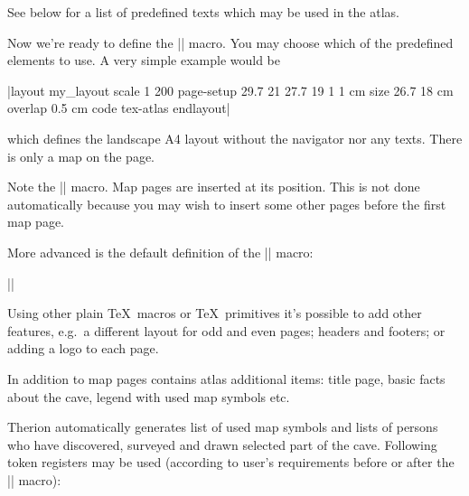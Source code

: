 See below for a list of predefined texts which may be used in the atlas.

Now we're ready to define the |\dopage| macro. You may choose which of the 
predefined elements to use. A very simple example would be

|layout my_layout
  scale 1 200
  page-setup 29.7 21 27.7 19 1 1 cm
  size 26.7 18 cm
  overlap 0.5 cm
  code tex-atlas
    \def\dopage{\box\mapbox}
    \insertmaps 
endlayout|

which defines the landscape A4 layout without the navigator nor any texts. There 
is only a map on the page.

Note the |\insertmaps| macro. Map pages are inserted at its position. 
This is not done automatically because you may wish to insert some other pages 
before the first map page. 

More advanced is the default definition of the |\dopage| macro:

|\def\dopage{%
 \vbox{\centerline{\framed{\mapbox}}
  \bigskip
  \line{%
    \vbox to \ht\navbox{
      \hbox{\size[20]\the\pagelabel
        \ifpagenumbering\space(\the\pagenum)\fi
        \space\size[16]\the\pagename}
      \ifpagenumbering
        \medskip
        \hbox{\qquad\qquad
          \vtop{%
            \hbox to 0pt{\hss\showpointer\pointerN\hss}
            \hbox to 0pt{\llap{\showpointer\pointerW\hskip0.7em}%
              \raise1pt\hbox to 0pt{\hss$\updownarrow$\hss}%
              \raise1pt\hbox to 0pt{\hss$\leftrightarrow$\hss}%
              \rlap{\hskip0.7em\showpointer\pointerE}}
              \hbox to 0pt{\hss\showpointer\pointerS\hss}
          }\qquad\qquad
          \vtop{
            \def\arr{$\uparrow$}
            \showpointerlist\pointerU
            \def\arr{$\downarrow$}
            \showpointerlist\pointerD
          }
        }
      \fi
      \vss
      \scalebar
    }\hss
    \box\navbox
  }
 }
}|

Using other plain \TeX\ macros or \TeX\ primitives it's possible to add other 
features, e.g.~a different layout for odd and even pages; headers and footers;
or adding a logo to each page. 

In addition to map pages contains atlas additional items: title page, basic 
facts about the cave, legend with used map symbols etc.

Therion automatically generates list of used map symbols and lists of persons
who have discovered, surveyed and drawn selected part of the cave. 
Following token registers may be used (according to user's requirements 
before or after the |\insertmaps| macro):

